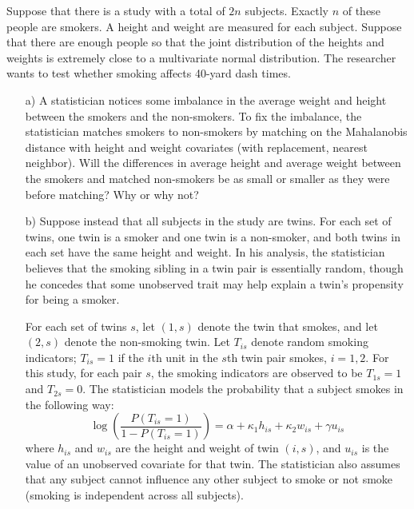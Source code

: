 \documentclass{article}
\begin{document}
  Suppose that there is a study with 
      a total of $2n$ subjects.
      Exactly $n$ of these people are smokers.
      A height and weight are measured for
      each subject.
      Suppose that there are enough people so that
      the joint distribution of the heights and weights is extremely close to a
      multivariate normal distribution.
      The researcher wants to test whether smoking affects 40-yard dash times.
      \begin{itemize}
        \item[a)]
          A statistician notices some imbalance in the average weight and height 
          between the smokers and the non-smokers.         
          To fix the imbalance, the statistician matches smokers
          to non-smokers by matching 
          on the Mahalanobis distance with height and weight covariates          
          (with replacement, nearest neighbor).
          Will the differences in average height and average
          weight between the smokers
          and matched non-smokers            
          be as small or smaller as they were before matching?  
          Why or why not?
        \item[b)]
          Suppose instead that all subjects in the study are twins.
          For each set of twins, one twin is a smoker and one twin is a non-smoker,
          and both twins in each set have the same height and weight.
          In his analysis, the statistician believes that 
          the smoking sibling in a twin pair 
          is essentially random, though he concedes
          that some unobserved trait may help explain a twin's 
          propensity for being a smoker.
           
          For each set of twins $s$, let $(1,s)$ denote the twin that smokes,
          and let $(2,s)$ denote the non-smoking twin.
          Let $T_{is}$ denote random smoking indicators;
          $T_{is} = 1$ if the $i$th unit in the $s$th twin pair smokes, $i = 1,2$.
          For this study, for each pair $s$, 
          the smoking indicators are observed to be $T_{1s} = 1$
          and $T_{2s} = 0$.
          The statistician models the probability that a subject smokes in the following way:
          \begin{equation}
            \log\left( 
              \frac{P(T_{is} = 1)}{1 - P(T_{is} = 1)}
            \right) = \alpha + \kappa_1 h_{is} + \kappa_2 w_{is} + \gamma u_{is}
            \label{probassign}
          \end{equation}
          where $h_{is}$ and $w_{is}$ are the height and weight of twin $(i,s)$,
          and $u_{is}$ is the value of an unobserved covariate for that twin.
          The statistician also assumes that any subject cannot influence
          any other subject to smoke or not smoke
          (smoking is independent across all subjects).
           

\end{itemize}
\end{document}
